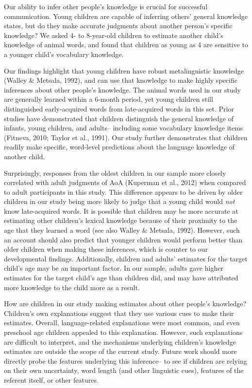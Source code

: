 \documentclass[10pt, letterpaper]{article}
\begin{document}
Our ability to infer other people's knowledge is crucial for successful
communication. Young children are capable of inferring others' general
knowledge states, but do they make accurate judgments about another
person's specific knowledge? We asked 4- to 8-year-old children to
estimate another child's knowledge of animal words, and found that
children as young as 4 are sensitive to a younger child's vocabulary
knowledge.

Our findings highlight that young children have robust metalinguistic
knowledge (Walley \& Metsala, 1992), and can use that knowledge to make
highly specific inferences about other people's knowledge. The animal
words used in our study are generally learned within a 6-month period,
yet young children still distinguished early-acquired words from
late-acquired words in this set. Prior studies have demonstrated that
children distinguish the general knowledge of infants, young children,
and adults-- including some vocabulary knowledge items (Fitneva, 2010;
Taylor et al., 1991). Our study further demonstrates that children
readily make specific, word-level predictions about the language
knowledge of another child.

Surprisingly, responses from the oldest children in our sample more
closely correlated with adult judgments of AoA (Kuperman et al., 2012)
when compared to adult participants in this study. This difference
appears to be driven by older children in our study being more likely to
judge that a young child would \emph{not} know late-acquired words. It
is possible that children may be more accurate at estimating other
children's lexical knowledge because of their proximity to the age that
they learned a word (see also Walley \& Metsala, 1992). However, such an
account should also predict that younger children would perform better
than older children when making these inferences, which is counter to
our developmental findings. Additionally, children and adults' estimates
for the target child's age may be an important factor. In our sample,
adults gave higher estimates for the target child's age than children
did, and may have attributed more knowledge to the child more as a
result.

How are children in our study making estimates about other people's
knowledge? Children's own explanations suggest that they use various
cues to make their estimates. Overall, language-related explanations
were most common, and even preschool age children appealed to this
explanation. However, such explanations are difficult to interpret, and
the mechanisms underlying children's knowledge estimates are outside the
scope of the current study. Future work should more directly probe the
features underlying this inference-- to see if children are relying on
their own uncertainty, word length (and other linguistic cues), features
of the referent itself, or other features.
\end{document}
